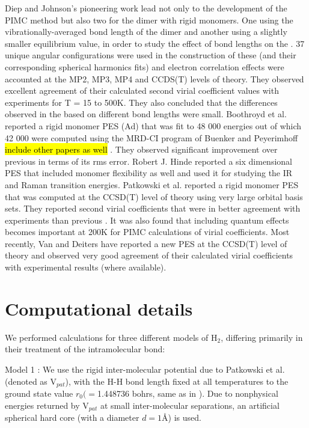         Diep and Johnson's \cite{Diep2000} pioneering work lead not only to the development of the PIMC method but also two \abinitio{} \PESs{} for the dimer with rigid monomers. One using the vibrationally-averaged bond length of the dimer and another using a slightly smaller equilibrium value, in order to study the effect of bond lengths on the \PESs{}. 37 unique angular configurations were used in the construction of these \PESs{} (and their corresponding spherical harmonics fits) and electron correlation effects were accounted at the MP2, MP3, MP4 and CCDS(T) levels of theory. They observed excellent agreement of their calculated second virial coefficient values with experiments for T = 15 to 500K. They also concluded that the differences observed in the \PESs{} based on different bond lengths were small. Boothroyd et al. \cite{Boothroyd2002} reported a rigid monomer PES (Ad) that was fit to \Sim{} 48 000 \abinitio{} energies out of which \Sim{} 42 000 were computed using the MRD-CI program of Buenker and Peyerimhoff \hl{include other papers as well} \cite{Buenker1974}. They observed significant improvement over previous \PESs{} in terms of its rms error. Robert J. Hinde \cite{Hinde2008} reported a six dimensional PES that included monomer flexibility as well and used it for studying the IR and Raman transition energies. Patkowski et al. \cite{Patkowski2008} reported a rigid monomer PES that was computed at the CCSD(T) level of theory using very large orbital basis sets. They reported second virial coefficients that were in better agreement with experiments than previous \PESs{}. It was also found that including quantum effects becomes important at \Sim{} 200K for PIMC calculations of virial coefficients. Most recently, Van and Deiters \cite{Tat2015} have reported a new \abinitio{} PES at the CCSD(T) level of theory and observed very good agreement of their calculated virial coefficients with experimental results (where available).

    \section{Computational details}
    \label{sec:Computational details}

        We performed calculations for three different models of H$_2$, differing primarily in their treatment of the intramolecular bond:
       
        Model 1 : We use the rigid inter-molecular potential due to Patkowski et al.\cite{Patkowski2008} (denoted as V$_{pat}$), with the H-H bond length fixed at all temperatures to the ground state value $r_0 ( = $1.448736 bohrs, same as in \cite{Patkowski2008}). Due to nonphysical energies returned by V$_{pat}$ at small inter-molecular separations, an artificial spherical hard core (with a diameter $d = 1${\AA}) is used.

